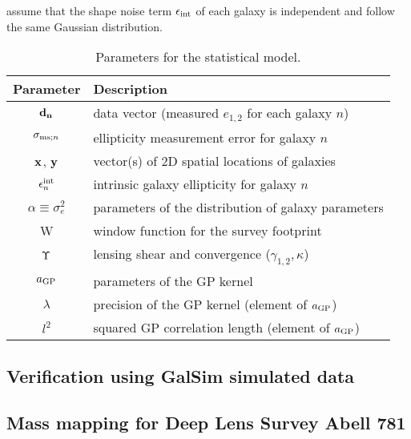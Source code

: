assume that the shape noise term $\epsilon_{\rm int}$ of each galaxy is 
independent and follow the same Gaussian distribution.  
 
\begin{table}%
\begin{center}
\caption{Parameters for the statistical model.}
\label{tab:sampling_parameters}
\begin{tabular}{cl}
\hline
Parameter & Description \\
\hline
${\bf d_{n}}$ & data vector (measured $e_{1,2}$ for each galaxy $n$)  \\
$\sigma_{{\rm ms}; n}$ & ellipticity measurement error for galaxy $n$ 
\\
$\mathbf{x}$, $\mathbf{y}$ & vector(s) of 2D spatial locations of galaxies \\
$\epsilon_n^{\rm int}$ & intrinsic galaxy ellipticity for galaxy $n$ \\
$\alpha\equiv\sigma_{e}^2$ & parameters of the distribution of galaxy parameters \\
W & window function for the survey footprint \\
$\Upsilon$ & lensing shear and convergence ($\gamma_{1,2}, \kappa$) \\
$a_{\rm GP}$ & parameters of the GP kernel\\
$\lambda$ & precision of the GP kernel (element of $a_{\rm GP}$) \\
$l^2$ & squared GP correlation length (element of $a_{\rm GP}$) \\
\hline
\end{tabular}
\end{center}
\end{table}



\subsection{Verification using {\sc GalSim} simulated data}
\subsection{Mass mapping for Deep Lens Survey Abell 781}


